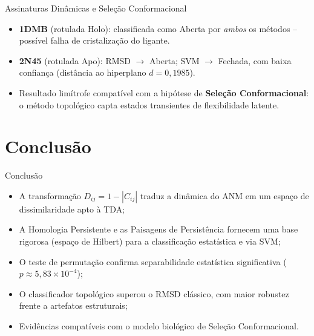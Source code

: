\documentclass[aspectratio=169]{beamer}
\begin{document}
\begin{frame}{Assinaturas Dinâmicas e Seleção Conformacional}
  \begin{itemize}
    \item \textbf{1DMB} (rotulada Holo): classificada como Aberta por \emph{ambos} os métodos -- possível falha de cristalização do ligante.
    \item \textbf{2N45} (rotulada Apo): RMSD $\to$ Aberta; SVM $\to$ Fechada, com baixa confiança (distância ao hiperplano $d=0{,}1985$).
    \item Resultado limítrofe compatível com a hipótese de \textbf{Seleção Conformacional}: o método topológico capta estados transientes de flexibilidade latente.
  \end{itemize}
\end{frame}

\section{Conclusão}

\begin{frame}{Conclusão}
  \begin{itemize}
    \item A transformação $D_{ij}=1-|C_{ij}|$ traduz a dinâmica do ANM em um espaço de dissimilaridade apto à TDA;
    \item A Homologia Persistente e as Paisagens de Persistência fornecem uma base rigorosa (espaço de Hilbert) para a classificação estatística e via SVM;
    \item O teste de permutação confirma separabilidade estatística significativa ($p \approx 5{,}83\times10^{-4}$);
    \item O classificador topológico superou o RMSD clássico, com maior robustez frente a artefatos estruturais;
    \item Evidências compatíveis com o modelo biológico de Seleção Conformacional.
  \end{itemize}
\end{frame}
\end{document}
